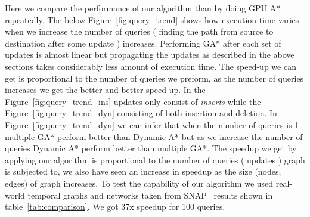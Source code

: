\documentclass[a4paper]{article}
\begin{document}
Here we compare the performance of our algorithm than by doing GPU A* repeatedly. The below Figure~\ref{fig:query_trend} shows how execution time varies when we increase the number of queries ( finding the path from source to destination after some update ) increases. Performing  GA* after each set of updates is almost linear but propagating the updates as described in the above sections takes considerably less amount of execution time. The speed-up we can get is proportional to the number of queries we preform, as the number of queries increases we get the better and better speed up. In the Figure~\ref{fig:query_trend_ins} updates only consist of \textit{inserts} while the Figure~\ref{fig:query_trend_dyn} consisting of both insertion and deletion. In Figure~\ref{fig:query_trend_dyn} we can infer that when the number of queries is 1 multiple GA* perform better than Dynamic A* but as we increase the number of queries Dynamic A* perform better than multiple GA*. The speedup we get by applying our algorithm is proportional to the number of queries ( updates ) graph is subjected to, we also have seen an increase in speedup as the size (nodes, edges) of graph increases. To test the capability of our algorithm we used real-world temporal graphs and networks taken from SNAP~\cite{SNAP} results shown in table~\ref{tab:comparison}. We got 37x speedup for 100 queries.
\end{document}
